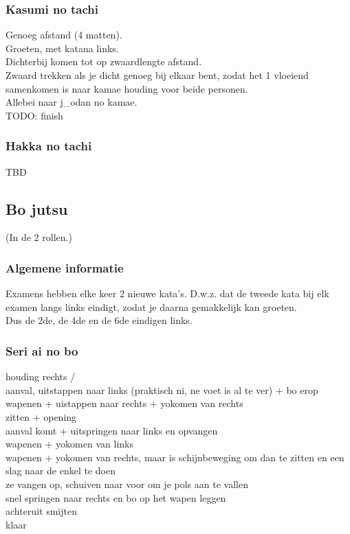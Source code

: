 \subsubsection{Kasumi no tachi}

Genoeg afstand (4 matten).\\
Groeten, met katana links.\\
Dichterbij komen tot op zwaardlengte afstand.\\
Zwaard trekken als je dicht genoeg bij elkaar bent, zodat het 1 vloeiend samenkomen is naar kamae houding voor beide personen.\\
Allebei naar j\_{o}dan no kamae.\\
TODO: finish

\subsubsection{Hakka no tachi}

TBD

\subsection{Bo jutsu}
(In de 2 rollen.)

\subsubsection{Algemene informatie}

Examens hebben elke keer 2 nieuwe kata's. D.w.z. dat de tweede kata bij elk examen langs links eindigt, zodat je daarna gemakkelijk kan groeten.\\
Dus de 2de, de 4de en de 6de eindigen links.

\subsubsection{Seri ai no bo}

houding rechts /\\
aanval, uitstappen naar links (praktisch ni, ne voet is al te ver) + bo erop\\
wapenen + uistappen naar rechts + yokomen van rechts\\
zitten + opening\\
aanval komt + uitspringen naar links en opvangen\\
wapenen + yokomen van links\\
wapenen + yokomen van rechts, maar is schijnbeweging om dan te zitten en een slag naar de enkel te doen\\
ze vangen op, schuiven naar voor om je pols aan te vallen\\
snel springen naar rechts en bo op het wapen leggen\\
achteruit smijten\\
klaar

